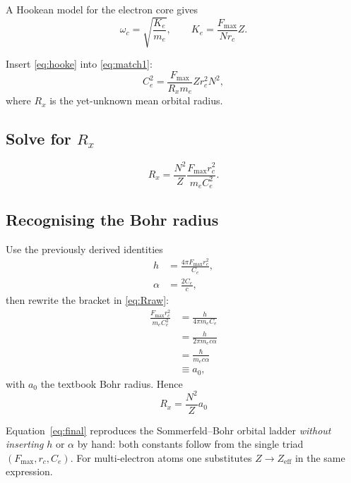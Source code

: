 A Hookean model for the electron core gives
\begin{equation}
    \omega_c = \sqrt{\frac{K_e}{m_e}}, \qquad
    K_e = \frac{F_{\max}}{N r_c} Z.
\label{eq:hooke}
\end{equation}

Insert \eqref{eq:hooke} into \eqref{eq:match1}:
\begin{equation}
    C_e^2 = \frac{F_{\max}}{R_x m_e} Z r_c^{2} N^{2},
\label{eq:master}
\end{equation}
where $R_x$ is the yet-unknown mean orbital radius.

\subsection{Solve for $R_x$}

\begin{equation}
    R_x = \frac{N^{2}}{Z} \frac{F_{\max} r_c^{2}}{m_e C_e^{2}}.
\label{eq:Rraw}
\end{equation}

\subsection{Recognising the Bohr radius}

Use the previously derived identities
\begin{align}
    h &= \frac{4\pi F_{\max} r_c^{2}}{C_e}, \tag{A} \\
\alpha &= \frac{2C_e}{c},\tag{B}
\end{align}
then rewrite the bracket in \eqref{eq:Rraw}:
\begin{align*}
\frac{F_{\max}r_c^{2}}{m_eC_e^{2}}
    &= \frac{h}{4\pi m_e C_e} \\
    &= \frac{h}{2\pi m_e c \alpha} \\
    &= \frac{\hbar}{m_e c \alpha} \\
    &\equiv a_0,
\end{align*}
with $a_0$ the textbook Bohr radius.  Hence
\begin{equation}
    \boxed{R_x = \frac{N^{2}}{Z} a_0}
\label{eq:final}
\end{equation}

Equation~\eqref{eq:final} reproduces the Sommerfeld--Bohr orbital ladder \textit{without inserting} $h$ or $\alpha$ by hand: both constants follow from the single triad $(F_{\max}, r_c, C_e)$. For multi-electron atoms one substitutes $Z \rightarrow Z_{\text{eff}}$ in the same expression.

